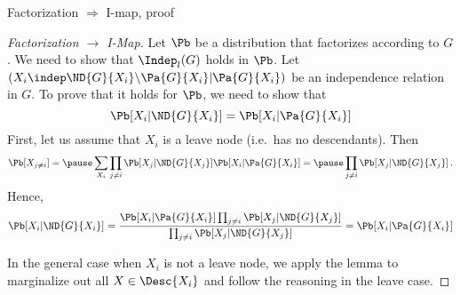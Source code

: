     \begin{frame}{Factorization $\Rightarrow$ I-map, proof}
    \begin{proof}[Factorization $\rightarrow$ I-Map]
    Let $\Pb$ be a distribution that factorizes according to $G$.
    We need to show that $\Indep_l(G)$ holds in $\Pb$.
    \pause
    Let $(X_i \indep \ND{G}{X_i} \backslash \Pa{G}{X_i}| \Pa{G}{X_i})$ be an independence relation in $G$.
    \pause
    To prove that it holds for $\Pb$, we need to show that
    \begin{equation}
        \Pb[X_i | \ND{G}{X_i} ] = \Pb[X_i | \Pa{G}{X_i}] 
    \end{equation}
    \pause
    First, let us assume that $X_i$ is a leave node (i.e.\ has no descendants).
    Then 
    \begin{equation}
        \label{eq:def-xi-nd}
        \Pb[X_{j \neq i}] = \pause \sum_{X_i} \prod_{j \neq i}\Pb[X_j| \ND{G}{X_j}] \Pb[X_i | \Pa{G}{X_i}] = \pause \prod_{j \neq i}\Pb[X_j| \ND{G}{X_j}]\,.
    \end{equation}
    \pause
    Hence,
    \begin{equation}
    \Pb[X_i | \ND{G}{X_i}] = \frac{\Pb[X_i | \Pa{G}{X_i}] \prod_{j \neq i}\Pb[X_j| \ND{G}{X_j}]}{\prod_{j \neq i} \Pb[X_j| \ND{G}{X_j}] } = \Pb[X_i | \Pa{G}{X_i}] 
    \end{equation}

    \pause
    In the general case when $X_i$ is not a leave node, we apply the lemma to marginalize out all $X \in \Desc{X_i}$ and follow the reasoning in the leave case.
\end{proof}
\end{frame}

